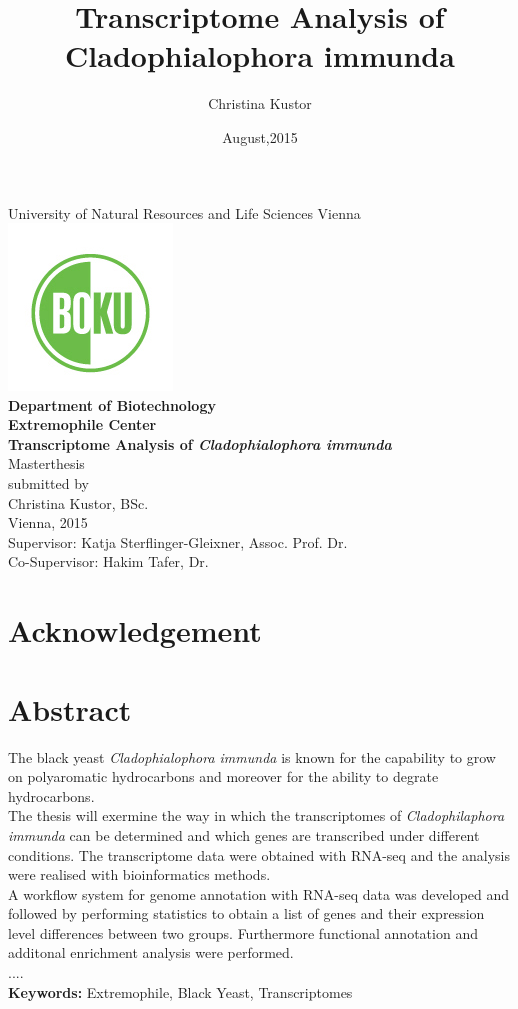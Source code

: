 \documentclass[12pt, a4paper]{report}
\title{Transcriptome Analysis of Cladophialophora immunda}
\author{Christina Kustor}
\date{August,2015}
\begin{document}
\newpage
\begin{center}
\large {University of Natural Resources and Life Sciences Vienna\\
\includegraphics{pics/boku_logo}\\
\bigskip
\textbf{Department of Biotechnology\\
Extremophile Center}}\\
\vspace*{1,5cm}
\LARGE\textbf{Transcriptome Analysis of 
\textit{Cladophialophora immunda}}\\
\vspace*{0,5cm}
\large {Masterthesis\\
\vspace*{1,5cm}
submitted by\\
Christina Kustor, BSc.\\
Vienna, 2015\\
\vspace*{1cm}
Supervisor: Katja Sterflinger-Gleixner, Assoc. Prof. Dr.\\
Co-Supervisor: Hakim Tafer, Dr.\\}
\end{center}

\newpage
\section*{Acknowledgement}
\newpage
{}
\section*{Abstract}
The black yeast \textit{Cladophialophora immunda} is known for the capability to grow on polyaromatic hydrocarbons and moreover for the ability to degrate hydrocarbons. \\
The thesis will exermine the way in which the transcriptomes of \textit{Cladophilaphora immunda} can be determined and which genes are transcribed under different conditions. The transcriptome data were obtained with RNA-seq and the analysis were realised with bioinformatics methods. \\
A workflow system for genome annotation with RNA-seq data was developed and followed by performing statistics to obtain a list of genes and their expression level differences between two groups. Furthermore functional annotation and additonal enrichment analysis were performed.\\
....
\\
\textbf{Keywords:} Extremophile, Black Yeast, Transcriptomes
\newpage
\end{document}
